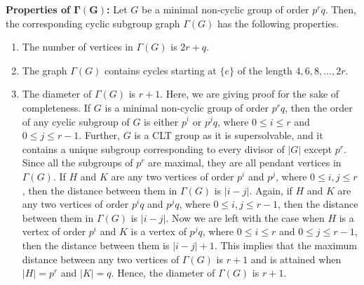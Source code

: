 \documentclass[11pt,twoside]{amsart}
\def \Ga {{\Gamma }}
\begin{document}
\vspace{0.2cm}
\noindent \textbf{Properties of $\mathbf{\Ga (G)}$:}
    Let $G$ be a minimal non-cyclic group of order $p^rq$. Then, the corresponding cyclic subgroup graph $\Ga (G)$ has the following properties.
    \begin{enumerate}[label={(\arabic*)}]
    \item The number of vertices in $\Ga (G)$ is $2r+q$.\\

    \item The graph $\Ga (G)$ contains cycles starting at $\{e\}$ of the length $4,6,8,\ldots ,2r$.\\

    \item The diameter of $\Ga (G)$ is $r+1$. Here, we are giving proof for the sake of completeness. If $G$ is a minimal non-cyclic group of order $p^rq$, then the order of any cyclic subgroup of $G$ is either $p^i$ or $p^jq$, where $0\leq i\leq r$ and $0\leq j\leq {r-1}$. Further, $G$ is a CLT group as it is supersolvable, and it contains a unique subgroup corresponding to every divisor of $|G|$ except $p^r$. Since all the subgroups of $p^r$ are maximal, they are all pendant vertices in $\Ga (G)$. If $H$ and $K$ are any two vertices of order $p^i$ and $p^j$, where $0\leq i,j \leq r$, then the distance between them in $\Ga (G)$ is $|i-j|$. Again, if $H$ and $K$ are any two vertices of order $p^iq$ and $p^jq$, where $0\leq i,j \leq {r-1}$, then the distance between them in $\Ga (G)$ is $|i-j|$. Now we are left with the case when $H$ is a vertex of order $p^i$ and $K$ is a vertex of $p^jq$, where $0\leq i \leq r$ and $0\leq j \leq {r-1}$, then the distance between them is $|i-j|+1$. This implies that the maximum distance between any two vertices of $\Ga (G)$ is $r+1$ and is attained when $|H|=p^r$ and $|K|=q$. Hence, the diameter of $\Ga (G)$ is $r+1$.\\


\end{enumerate}
\end{document}
